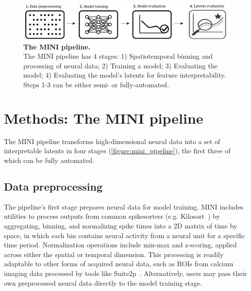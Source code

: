 \begin{figure}[h]
    \centering
    \includegraphics[width=\linewidth]{figures/mini_pipeline.pdf}
    \caption{
        \textbf{The MINI pipeline.} \\
        \small The MINI pipeline has 4 stages: 1) Spatiotemporal binning and processing of neural data; 2) Training a model; 3) Evaluating the model; 4) Evaluating the model's latents for feature interpretability. Steps 1-3 can be either semi- or fully-automated.
        \vspace{-1em}
    }
    \label{figure:mini_pipeline}
\end{figure}

\section{Methods: The MINI pipeline}

The MINI pipeline transforms high-dimensional neural data into a set of interpretable latents in four stages (\autoref{figure:mini_pipeline}), the first three of which can be fully automated.

\subsection{Data preprocessing}

The pipeline's first stage prepares neural data for model training. MINI includes utilities to process outputs from common spikesorters (e.g. Kilosort~\cite{pachitariu_2016_kilosort}) by aggregating, binning, and normalizing spike times into a 2D matrix of time by space, in which each bin contains neural activity from a neural unit for a specific time period. Normalization operations include min-max and z-scoring, applied across either the spatial or temporal dimension. This processing is readily adaptable to other forms of acquired neural data, such as ROIs from calcium imaging data processed by tools like Suite2p~\cite{pachitariu_2017_suite2p}. Alternatively, users may pass their own preprocessed neural data directly to the model training stage.

